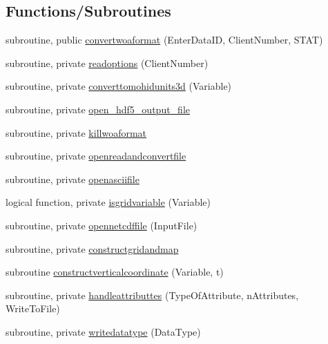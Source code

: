\subsection*{Functions/\+Subroutines}
\begin{DoxyCompactItemize}
\item 
subroutine, public \mbox{\hyperlink{namespacemodulewoaformat_a78a5f7c9fae1c493a47fc480b6f3dd86}{convertwoaformat}} (Enter\+Data\+ID, Client\+Number, S\+T\+AT)
\item 
subroutine, private \mbox{\hyperlink{namespacemodulewoaformat_a6d0d1a11ce029e5c725fd2564de93691}{readoptions}} (Client\+Number)
\item 
subroutine, private \mbox{\hyperlink{namespacemodulewoaformat_aefda2556422f044d5397391c5c5acb66}{converttomohidunits3d}} (Variable)
\item 
subroutine, private \mbox{\hyperlink{namespacemodulewoaformat_a3e2b959a1593bc7b6e5a52af13544bd1}{open\+\_\+hdf5\+\_\+output\+\_\+file}}
\item 
subroutine, private \mbox{\hyperlink{namespacemodulewoaformat_a99457d9a1095fca3854b2b8c53566889}{killwoaformat}}
\item 
subroutine, private \mbox{\hyperlink{namespacemodulewoaformat_a35891daf8ac8bd662f8f59f673e72cfe}{openreadandconvertfile}}
\item 
subroutine, private \mbox{\hyperlink{namespacemodulewoaformat_a0619fabdf9d39428f66319ee125ed3ce}{openasciifile}}
\item 
logical function, private \mbox{\hyperlink{namespacemodulewoaformat_abb1720ff0eef8f5649a76ab7702d73f7}{isgridvariable}} (Variable)
\item 
subroutine, private \mbox{\hyperlink{namespacemodulewoaformat_a77c643507a170a9ebd07fd0cbb9616f8}{opennetcdffile}} (Input\+File)
\item 
subroutine, private \mbox{\hyperlink{namespacemodulewoaformat_a8428b35a710ef648826b1b6b2273d34f}{constructgridandmap}}
\item 
subroutine \mbox{\hyperlink{namespacemodulewoaformat_a67b34e0648f36008251527dc7f49084b}{constructverticalcoordinate}} (Variable, t)
\item 
subroutine, private \mbox{\hyperlink{namespacemodulewoaformat_a54028cfada0d5c06f32d22ec3050fc95}{handleattributtes}} (Type\+Of\+Attribute, n\+Attributes, Write\+To\+File)
\item 
subroutine, private \mbox{\hyperlink{namespacemodulewoaformat_a87baefa0ce052791b45523ab1bd52868}{writedatatype}} (Data\+Type)
\item 

\end{DoxyCompactItemize}
